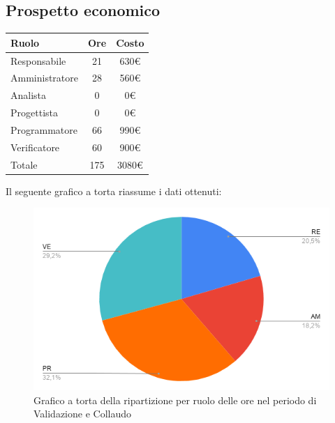 {{{{{{{{{{{{{{{{{{\subsection{Prospetto economico}\label{PreventivoPreventivoFaseDiProgettazionediValidazioneECollaudoProspettoEconomico}
\quad
\def\tabularxcolumn#1{m{#1}}
{
	\begin{center}
		\renewcommand{\arraystretch}{1.4}
		\begin{tabularx}{7cm}{|X|c|c|}
			\hline
			\rowcolor{airforceblue}
			\textbf{Ruolo} & \textbf{Ore} & \textbf{Costo}\\
			\hline
			Responsabile & 21 & 630\euro\\
			\hline
			Amministratore & 28 & 560\euro\\
			\hline
			Analista & 0 & 0\euro\\
			\hline
			Progettista & 0 & 0\euro\\
			\hline
			Programmatore & 66 & 990\euro\\
			\hline
			Verificatore & 60 & 900\euro\\
			\hline
			Totale & 175 & 3080\euro\\
			\hline
		\end{tabularx}
	\end{center}

Il seguente grafico a torta riassume i dati ottenuti:
\begin{figure}[!ht]
	\begin{center}
		\includegraphics[width=0.8\linewidth]{../immagini/pdp/torta_validazione.png}
		\caption{Grafico a torta della ripartizione per ruolo delle ore nel periodo di Validazione e Collaudo}
	\end{center}
\end{figure}

}}}}}}}}}}}}}}}}}}}
